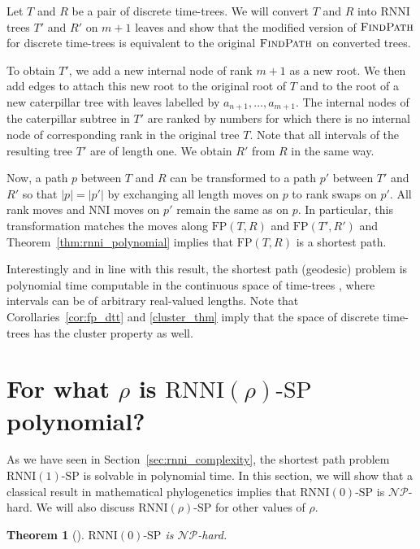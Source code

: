 \documentclass[11pt]{amsart}
\newtheorem{theorem}{Theorem}
\newcommand{\rnni}{\mathrm{RNNI}}
\newcommand{\findpath}{\textsc{FindPath}}
\newcommand{\nni}{\mathrm{NNI}}
\newcommand{\fp}{\mathrm{FP}}
\newcommand{\np}{\mathcal{NP}}
\newcommand{\p}{\mathcal{P}}
\newcommand{\decprob}[1]{\rnni(#1)\text{-}\mathrm{SP}}
\newcommand{\summary}[1]{} %
\begin{document}
\proof
Let $T$ and $R$ be a pair of discrete time-trees.
We will convert $T$ and $R$ into $\rnni$ trees $T'$ and $R'$ on $m + 1$ leaves and show that the modified version of $\findpath$ for discrete time-trees is equivalent to the original $\findpath$ on converted trees.

To obtain $T'$, we add a new internal node of rank $m + 1$ as a new root.
We then add edges to attach this new root to the original root of $T$ and to the root of a new caterpillar tree with leaves labelled by $a_{n + 1}, \ldots, a_{m + 1}$.
The internal nodes of the caterpillar subtree in $T'$ are ranked by numbers for which there is no internal node of corresponding rank in the original tree $T$.
Note that all intervals of the resulting tree $T'$ are of length one.
We obtain $R'$ from $R$ in the same way.

Now, a path $p$ between $T$ and $R$ can be transformed to a path $p'$ between $T'$ and $R'$ so that $|p| = |p'|$ by exchanging all length moves on $p$ to rank swaps on $p'$.
All rank moves and $\nni$ moves on $p'$ remain the same as on $p$.
In particular, this transformation matches the moves along $\fp(T,R)$ and $\fp(T',R')$ and Theorem~\ref{thm:rnni_polynomial} implies that $\fp(T, R)$ is a shortest path.
\endproof

Interestingly and in line with this result, the shortest path (geodesic) problem is polynomial time computable in the continuous space of time-trees \autocite{Gavryushkin2016-uu}, where intervals can be of arbitrary real-valued lengths.
Note that Corollaries~\ref{cor:fp_dtt} and \ref{cluster_thm} imply that the space of discrete time-trees has the cluster property as well.


\section{For what $\rho$ is $\decprob{\rho}$ polynomial?}

\summary{Summarising results on complexity of $\decprob{\rho}$ -- $\decprob{1} \in \p$ and $\decprob{0} \in \np$}
As we have seen in Section~\ref{sec:rnni_complexity}, the shortest path problem $\decprob{1}$ is solvable in polynomial time.
In this section, we will show that a classical result in mathematical phylogenetics implies that $\decprob{0}$ is $\np$-hard.
We will also discuss $\decprob{\rho}$ for other values of $\rho$.

\begin{theorem}[\textcite{Dasgupta2000-xa}]
$\decprob{0}$ is $\np$-hard.
\end{theorem}
\end{document}
